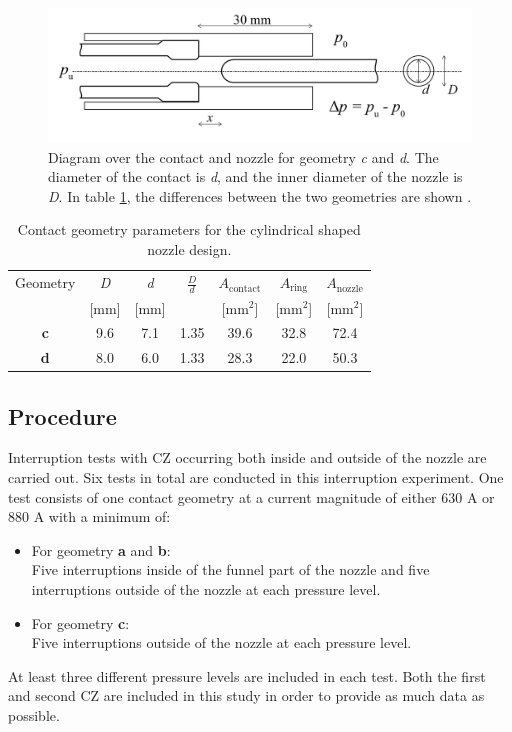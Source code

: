 \documentclass[10pt,b5paper,twoside]{article}
\begin{document}
\begin{figure} [H]
\centering
\includegraphics[scale=0.3]{Bilder/Method/contactSetUp.png}
\caption{Diagram over the contact and nozzle for geometry \textit{c} and \textit{d}. The diameter of the contact is \textit{d}, and the inner diameter of the nozzle is \textit{D}. In table \ref{tab:contGeoParaC}, the differences between the two geometries are shown \cite{bib:AFIMVLBA}.} \label{fig:contactAndNozzleC}
\end{figure}

\begin{table}[H]
\center
\caption{Contact geometry parameters for the cylindrical shaped nozzle design.}
 \begin{tabular}{|c|c|c|c|c|c|c|}
\hline 
Geometry & \textit{D} & \textit{d}  & $\frac{D}{d}$ &  $A_\mathrm{{contact}}$ & $A_\mathrm{{ring}}$  & $A_\mathrm{{nozzle}}$ \\
  & [mm] &  [mm] &   &  [mm$^2$] &  [mm$^2$] &   [mm$^2$] \\
\hline 
\textbf{c} & 9.6 & 7.1 & 1.35 & 39.6 & 32.8 & 72.4 \\ 
\hline
\textbf{d} & 8.0 & 6.0 & 1.33 & 28.3 & 22.0 & 50.3 \\ 
\hline
\end{tabular} 
\label{tab:contGeoParaC}
\end{table}

\subsection{Procedure} \label{sec:procedure}
Interruption tests with CZ occurring both inside and outside of the nozzle are carried out. Six tests in total are conducted in this interruption experiment. One test consists of one contact geometry at a current magnitude of either 630 A or 880 A with a minimum of:
\begin{itemize}
\item For geometry \textbf{a} and \textbf{b}: \\
Five interruptions inside of the funnel part of the nozzle and five interruptions outside of the nozzle at each pressure level.

\item For geometry \textbf{c}: \\
Five interruptions outside of the nozzle at each pressure level.

\end{itemize}
At least three different pressure levels are included in each test. Both the first and second CZ are included in this study in order to provide as much data as possible.
\end{document}
